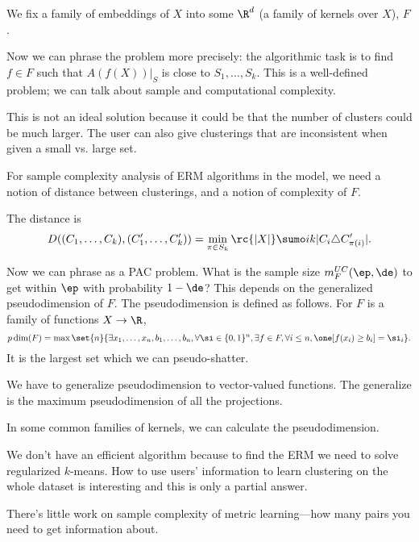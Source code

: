We fix a family of embeddings of $X$ into some $\R^d$ (a family of kernels over $X$), $F$.

Now we can phrase the problem more precisely: the algorithmic task is to find $f\in F$ such that 
$
A(f(X))|_S
$
is close to $S_1,\ldots, S_k$.
This is a well-defined problem; we can talk about sample and computational complexity.

This is not an ideal solution because it could be that the number of clusters could be much larger. The user can also give clusterings that are inconsistent when given a small vs. large set.



For sample complexity analysis of ERM algorithms in the model, we need a notion of distance between clusterings, and a notion of complexity of $F$.


The distance is
$$
D((C_1,\ldots, C_k),(C_1',\ldots, C_k')) = 
\min_{\pi \in S_k} \rc{|X|}\sumo ik |C_i \triangle C_{\pi(i)}'|.
$$

Now we can phrase as a PAC problem.
What is the sample size $m^{UC}_F(\ep,\de)$ to get within $\ep$ with probability $1-\de$?
This depends on the generalized pseudodimension of $F$. The pseudodimension is defined as follows. For $F$ is a family of functions $X\to \R$, 
$$
p\dim(F) = \max\set{n}{\exists x_1,\ldots, x_n,b_1,\ldots, b_n, \forall \si\in \{0,1\}^n, \exists f\in F, \forall i\le n, \one[f(x_i)\ge b_i] = \si_i
}.
$$
It is the largest set which we can pseudo-shatter.

We have to generalize pseudodimension to vector-valued functions. The generalize is the maximum pseudodimension of all the projections. %

In some common families of kernels, we can calculate the pseudodimension.

We don't have an efficient algorithm because to find the ERM we need to solve regularized $k$-means. How to use users' information to learn clustering on the whole dataset is interesting and this is only a partial answer.

There's little work on sample complexity of metric learning---how many pairs you need to get information about.

